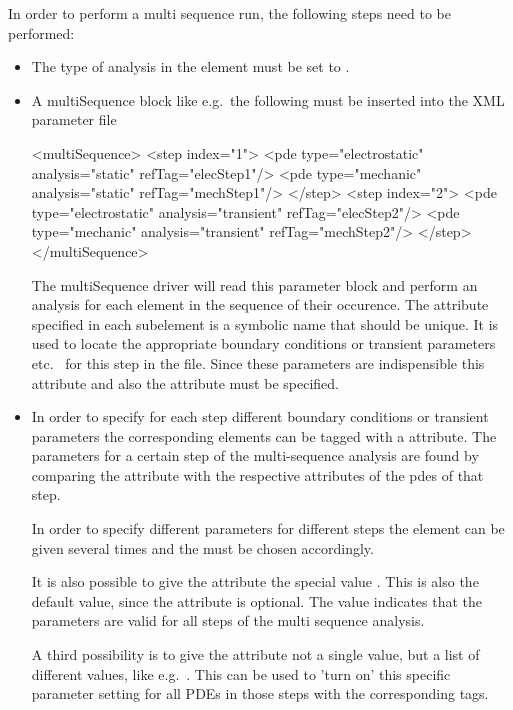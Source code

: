 In order to perform a multi sequence run, the following steps need to be
performed:
%
%
\begin{itemize}
\item The type of analysis in the  element must be set to
      .
\item A multiSequence block like e.g.~the following must be inserted into
      the XML parameter file
\begin{xmllisting}
<multiSequence>
  <step index="1">
    <pde type="electrostatic" analysis="static" refTag="elecStep1"/>
    <pde type="mechanic" analysis="static" refTag="mechStep1"/>
  </step>
  <step index="2">
    <pde type="electrostatic" analysis="transient" refTag="elecStep2"/>
    <pde type="mechanic" analysis="transient" refTag="mechStep2"/>
  </step>
</multiSequence>
\end{xmllisting}
      The multiSequence driver will read this parameter block and perform
      an analysis for each  element in the sequence of their
      occurence. The  attribute specified in each
       subelement is a symbolic name that should be unique. It
      is used to locate the appropriate boundary conditions or transient
parameters
      etc.~ for this step in the file. Since these parameters are indispensible
      this attribute and also the  attribute must be
      specified.
\item In order to specify for each step different boundary conditions or
      transient parameters the corresponding elements can be tagged with a
       attribute. The parameters for a certain step of the
      multi-sequence analysis are found by comparing the 
      attribute with the respective  attributes of the pdes of
      that step.

      In order to specify different parameters for different steps the element
      can be given several times and the  must be chosen
      accordingly.

      It is also possible to give the  attribute the special
      value
      . This is also the default value, since the
       attribute is optional. The  value
indicates
      that the parameters are valid for all steps of the multi sequence
analysis.

      A third possibility is to give the  attribute not a single
      value, but a list of different values, like
      e.g.~. This can be used to 'turn on' this
      specific parameter setting for all PDEs in those steps with the
      corresponding tags.


\end{itemize}
